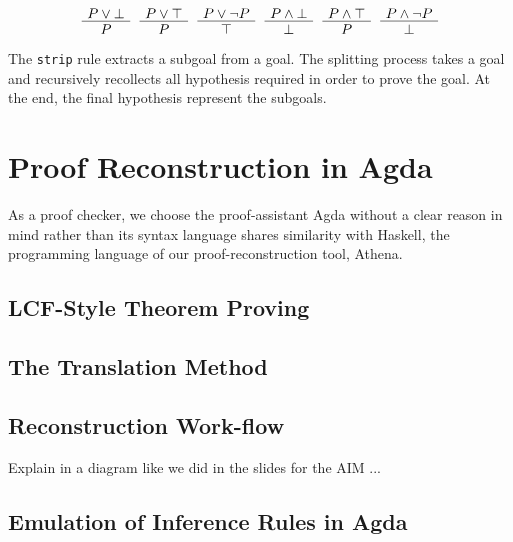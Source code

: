 \documentclass[runningheads,a4paper]{llncs}
\newenvironment{bprooftree}
  {\leavevmode\hbox\bgroup}
  {\DisplayProof\egroup}
\begin{document}
\[
\begin{bprooftree}
  \AxiomC{$P \vee \bot$}
  \UnaryInfC{$P$}
\end{bprooftree}
\begin{bprooftree}
\AxiomC{$P \vee \top$}
\UnaryInfC{$P$}
\end{bprooftree}
\begin{bprooftree}
\AxiomC{$P \vee \neg P$}
\UnaryInfC{$\top$}
\end{bprooftree}
\begin{bprooftree}
  \AxiomC{$P \wedge \bot$}
  \UnaryInfC{$\bot$}
\end{bprooftree}
\begin{bprooftree}
  \AxiomC{$P \wedge \top$}
  \UnaryInfC{$P$}
\end{bprooftree}
\begin{bprooftree}
  \AxiomC{$P \wedge \neg P$}
  \UnaryInfC{$\bot$}
\end{bprooftree}
\]

The \verb!strip! rule extracts a subgoal from a goal. The splitting process
takes a goal and recursively recollects all hypothesis required in order to prove the goal.
At the end, the final hypothesis represent the subgoals.




\section{Proof Reconstruction in Agda}
\label{secproofrecon}
As a proof checker, we choose the proof-assistant Agda without a clear reason in mind
rather than its syntax language shares similarity with Haskell, the programming language
of our proof-reconstruction tool, Athena.



\subsection{LCF-Style Theorem Proving}

\subsection{The Translation Method}
\subsection{Reconstruction Work-flow}
Explain in a diagram like we did in the slides for the AIM ...

\subsection{Emulation of Inference Rules in Agda}
\end{document}
